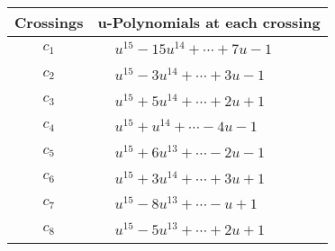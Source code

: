 \documentclass[1p]{elsarticle_modified}
\theoremstyle{definition}
\begin{document}
\begin{tabular}{m{50pt}|m{274pt}}
Crossings & \hspace{64pt}u-Polynomials at each crossing \\
\hline $$\begin{aligned}c_{1}\end{aligned}$$&$\begin{aligned}
&u^{15}-15 u^{14}+\cdots+7 u-1
\end{aligned}$\\
\hline $$\begin{aligned}c_{2}\end{aligned}$$&$\begin{aligned}
&u^{15}-3 u^{14}+\cdots+3 u-1
\end{aligned}$\\
\hline $$\begin{aligned}c_{3}\end{aligned}$$&$\begin{aligned}
&u^{15}+5 u^{14}+\cdots+2 u+1
\end{aligned}$\\
\hline $$\begin{aligned}c_{4}\end{aligned}$$&$\begin{aligned}
&u^{15}+u^{14}+\cdots-4 u-1
\end{aligned}$\\
\hline $$\begin{aligned}c_{5}\end{aligned}$$&$\begin{aligned}
&u^{15}+6 u^{13}+\cdots-2 u-1
\end{aligned}$\\
\hline $$\begin{aligned}c_{6}\end{aligned}$$&$\begin{aligned}
&u^{15}+3 u^{14}+\cdots+3 u+1
\end{aligned}$\\
\hline $$\begin{aligned}c_{7}\end{aligned}$$&$\begin{aligned}
&u^{15}-8 u^{13}+\cdots- u+1
\end{aligned}$\\
\hline $$\begin{aligned}c_{8}\end{aligned}$$&$\begin{aligned}
&u^{15}-5 u^{13}+\cdots+2 u+1
\end{aligned}$\\

\end{tabular}
\end{document}
